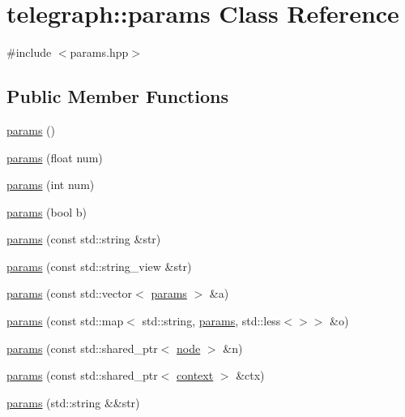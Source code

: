\hypertarget{classtelegraph_1_1params}{}\section{telegraph\+:\+:params Class Reference}
\label{classtelegraph_1_1params}


{\ttfamily \#include $<$params.\+hpp$>$}

\subsection*{Public Member Functions}
\begin{DoxyCompactItemize}
\item 
\hyperlink{classtelegraph_1_1params_af67ec32e2151fd4dd8ec293df29b48d5}{params} ()
\item 
\hyperlink{classtelegraph_1_1params_ae2725f3f72d6a482bfea6260765ce399}{params} (float num)
\item 
\hyperlink{classtelegraph_1_1params_a2b78a3815af2c3676711e254723b80bc}{params} (int num)
\item 
\hyperlink{classtelegraph_1_1params_aef16e2c000f108545f647eb692da423b}{params} (bool b)
\item 
\hyperlink{classtelegraph_1_1params_a1558d332229445b7082ed2507cbd7a99}{params} (const std\+::string \&str)
\item 
\hyperlink{classtelegraph_1_1params_a062cab338a066baa48cbadaaa73cf463}{params} (const std\+::string\+\_\+view \&str)
\item 
\hyperlink{classtelegraph_1_1params_a6636bd21082c7c08d825d83d6b480a68}{params} (const std\+::vector$<$ \hyperlink{classtelegraph_1_1params}{params} $>$ \&a)
\item 
\hyperlink{classtelegraph_1_1params_ad32b25b3cbc41b7ae38edcd86ed47c37}{params} (const std\+::map$<$ std\+::string, \hyperlink{classtelegraph_1_1params}{params}, std\+::less$<$$>$$>$ \&o)
\item 
\hyperlink{classtelegraph_1_1params_a78343b225800e61b1a9f5a0db2417c49}{params} (const std\+::shared\+\_\+ptr$<$ \hyperlink{classtelegraph_1_1node}{node} $>$ \&n)
\item 
\hyperlink{classtelegraph_1_1params_a18abea3f64064af7363efb4e0f7e28bb}{params} (const std\+::shared\+\_\+ptr$<$ \hyperlink{classtelegraph_1_1context}{context} $>$ \&ctx)
\item 
\hyperlink{classtelegraph_1_1params_acd021c368b92787dee7a852d6b7434b9}{params} (std\+::string \&\&str)
\item 

\end{DoxyCompactItemize}
